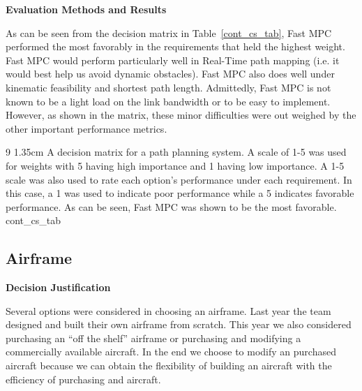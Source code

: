 \textbf{Evaluation Methods and Results}

As can be seen from the decision matrix in Table~\ref{cont_cs_tab}, Fast MPC performed the most favorably in the requirements that held the highest weight. Fast MPC would perform particularly well in Real-Time path mapping  (i.e. it would best help us avoid dynamic obstacles). Fast MPC also does well under kinematic feasibility and shortest path length. Admittedly, Fast MPC is not known to be a light load on the link bandwidth or to be easy to implement. However, as shown in the matrix, these minor difficulties were out weighed by the other important performance metrics.

\begin{AUVSITable}
{9}
{1.35cm}
{A decision matrix for a path planning system. A scale of 1-5 was used for weights with 5 having high importance and 1 having low importance. A 1-5 scale was also used to rate each option’s performance under each requirement. In this case, a 1 was used to indicate poor performance while a 5 indicates favorable performance. As can be seen, Fast MPC was shown to be the most favorable.}
{cont_cs_tab}


\end{AUVSITable}

\subsection{Airframe}

\textbf{Decision Justification}

Several options were considered in choosing an airframe. Last year the team designed and built their own airframe from scratch. This year we also considered purchasing an “off the shelf” airframe or purchasing and modifying a commercially available aircraft. In the end we choose to modify an purchased aircraft because we can obtain the flexibility of building an aircraft with the efficiency of purchasing and aircraft.


